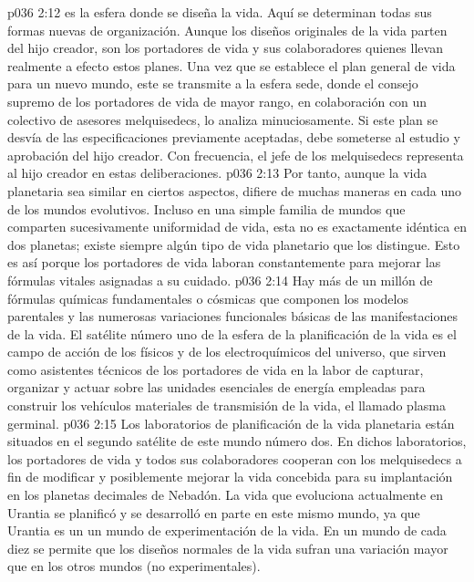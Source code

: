 \vs p036 2:12 \pc {} es la esfera donde se diseña la vida. Aquí se determinan todas sus formas nuevas de organización. Aunque los diseños originales de la vida parten del hijo creador, son los portadores de vida y sus colaboradores quienes llevan realmente a efecto estos planes. Una vez que se establece el plan general de vida para un nuevo mundo, este se transmite a la esfera sede, donde el consejo supremo de los portadores de vida de mayor rango, en colaboración con un colectivo de asesores melquisedecs, lo analiza minuciosamente. Si este plan se desvía de las especificaciones previamente aceptadas, debe someterse al estudio y aprobación del hijo creador. Con frecuencia, el jefe de los melquisedecs representa al hijo creador en estas deliberaciones.
\vs p036 2:13 Por tanto, aunque la vida planetaria sea similar en ciertos aspectos, difiere de muchas maneras en cada uno de los mundos evolutivos. Incluso en una simple familia de mundos que comparten sucesivamente uniformidad de vida, esta no es exactamente idéntica en dos planetas; existe siempre algún tipo de vida planetario que los distingue. Esto es así porque los portadores de vida laboran constantemente para mejorar las fórmulas vitales asignadas a su cuidado.
\vs p036 2:14 Hay más de un millón de fórmulas químicas fundamentales o cósmicas que componen los modelos parentales y las numerosas variaciones funcionales básicas de las manifestaciones de la vida. El satélite número uno de la esfera de la planificación de la vida es el campo de acción de los físicos y de los electroquímicos del universo, que sirven como asistentes técnicos de los portadores de vida en la labor de capturar, organizar y actuar sobre las unidades esenciales de energía empleadas para construir los vehículos materiales de transmisión de la vida, el llamado plasma germinal.
\vs p036 2:15 Los laboratorios de planificación de la vida planetaria están situados en el segundo satélite de este mundo número dos. En dichos laboratorios, los portadores de vida y todos sus colaboradores cooperan con los melquisedecs a fin de modificar y posiblemente mejorar la vida concebida para su implantación en los planetas decimales de Nebadón. La vida que evoluciona actualmente en Urantia se planificó y se desarrolló en parte en este mismo mundo, ya que Urantia es un  un mundo de experimentación de la vida. En un mundo de cada diez se permite que los diseños normales de la vida sufran una variación mayor que en los otros mundos (no experimentales).
